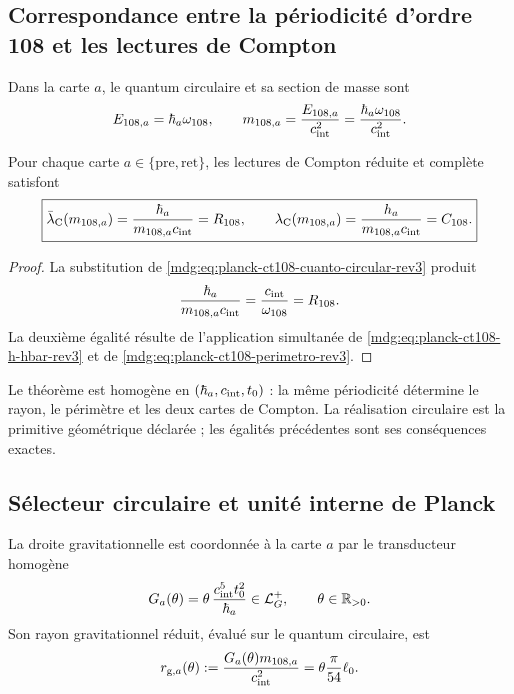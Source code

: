 \subsection{Correspondance entre la périodicité d’ordre 108 et les lectures de Compton}

Dans la carte \(a\), le quantum circulaire et sa section de masse sont
\begin{equation}
 E_{108,a}=\hbar_a\omega_{108},
 \qquad
 m_{108,a}=\frac{E_{108,a}}{c_{\rm int}^{2}}
 =\frac{\hbar_a\omega_{108}}{c_{\rm int}^{2}}.
 \label{mdg:eq:planck-ct108-cuanto-circular-rev3}
\end{equation}

\begin{theorem}
\label{mdg:thm:planck-ct108-compton-rev3}
Pour chaque carte \(a\in\{\mathrm{pre},\mathrm{ret}\}\), les lectures de
Compton réduite et complète satisfont
\begin{equation}
 \boxed{
 \bar\lambda_{\rm C}(m_{108,a})
 =\frac{\hbar_a}{m_{108,a}c_{\rm int}}=R_{108},
 \qquad
 \lambda_{\rm C}(m_{108,a})
 =\frac{h_a}{m_{108,a}c_{\rm int}}=C_{108}.}
 \label{mdg:eq:planck-ct108-identidad-compton-rev3}
\end{equation}
\end{theorem}

\begin{proof}
La substitution de
\eqref{mdg:eq:planck-ct108-cuanto-circular-rev3} produit
\[
 \frac{\hbar_a}{m_{108,a}c_{\rm int}}
 =\frac{c_{\rm int}}{\omega_{108}}=R_{108}.
\]
La deuxième égalité résulte de l’application simultanée de
\eqref{mdg:eq:planck-ct108-h-hbar-rev3} et de
\eqref{mdg:eq:planck-ct108-perimetro-rev3}.
\end{proof}

Le théorème est homogène en
\((\hbar_a,c_{\rm int},t_0)\) : la même périodicité détermine le rayon,
le périmètre et les deux cartes de Compton. La réalisation circulaire est la
primitive géométrique déclarée ; les égalités précédentes sont ses
conséquences exactes.

\subsection{Sélecteur circulaire et unité interne de Planck}

La droite gravitationnelle est coordonnée à la carte \(a\) par le transducteur
homogène
\begin{equation}
 G_a(\theta)=\theta\,
 \frac{c_{\rm int}^{5}t_0^2}{\hbar_a}
 \in\mathcal L_G^+,
 \qquad \theta\in\mathbb R_{>0}.
 \label{mdg:eq:planck-ct108-transductor-rev3}
\end{equation}
Son rayon gravitationnel réduit, évalué sur le quantum circulaire, est
\begin{equation}
 r_{{\rm g},a}(\theta)
 :=\frac{G_a(\theta)m_{108,a}}{c_{\rm int}^{2}}
 =\theta\frac{\pi}{54}\ell_0.
 \label{mdg:eq:planck-ct108-radio-gravitatorio-rev3}
\end{equation}

